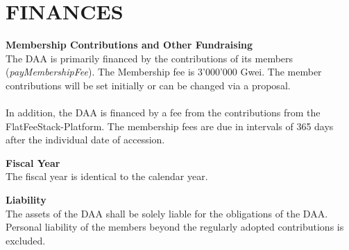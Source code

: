 \section{FINANCES}\label{sec:finances}

\item \textbf{Membership Contributions and Other Fundraising} \\
The DAA is primarily financed by the contributions of its members (\emph{payMembershipFee}).
The Membership fee is 3'000'000 Gwei.
The member contributions will be set initially or can be changed via a proposal. \\ \\
In addition, the DAA is financed by a fee from the contributions from the FlatFeeStack-Platform.
The membership fees are due in intervals of 365 days after the individual date of accession.

\item \textbf{Fiscal Year} \\
The fiscal year is identical to the calendar year.

\item \textbf{Liability} \\
The assets of the DAA shall be solely liable for the obligations of the DAA.
Personal liability of the members beyond the regularly adopted contributions is excluded.
